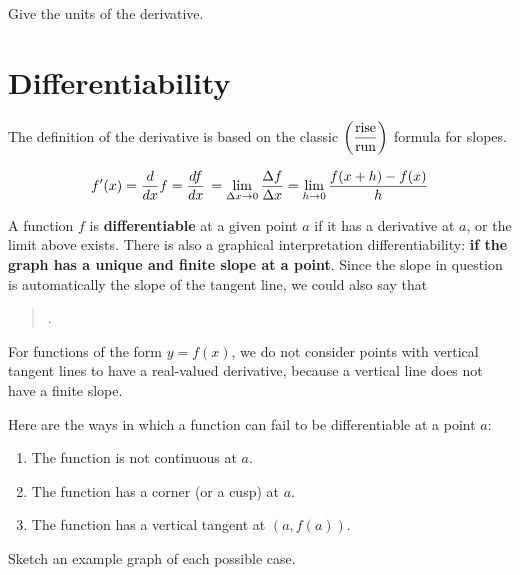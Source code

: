 \problem Give the units of the derivative.
\vspace{1in}

\newpage


\section*{Differentiability}


The definition of the derivative is based on the classic
$\displaystyle \left(\frac{\mbox{rise}}{\mbox{run}}\right)$ formula for slopes.

\begin{align*} 
  f'(x) = \frac{d}{dx} f = \frac{df}{dx} \, = \lim_{\Delta x \to 0} \frac{\Delta f}{\Delta x} = \lim_{h \to 0} \frac{f(x+h) - f(x)}{h}
\end{align*} 

\newpage

A function $f$ is {\bf{differentiable}} at a given point $a$ if it has
a derivative at $a$, or the limit above exists.  There is also a
graphical interpretation differentiability: {\bf{if the graph has a
    unique and finite slope at a point}}.  Since the slope in question
is automatically the slope of the tangent line, we could also say that

\begin{quote} {}.
\end{quote}

\vfill

For functions of the form $y = f(x)$, we do not consider points with
vertical tangent lines to have a real-valued derivative, because a
vertical line does not have a finite slope.

\vsc
\newpage


Here are the ways in which a function can fail to be differentiable at a point $a$:
\begin{enumerate}
\item The function is not continuous at $a$.
\item The function has a corner (or a cusp) at $a$.
\item The function has a vertical tangent at $(a,f(a))$.
\end{enumerate}

\problem Sketch an example graph of each possible case.

\vfill

\newpage


